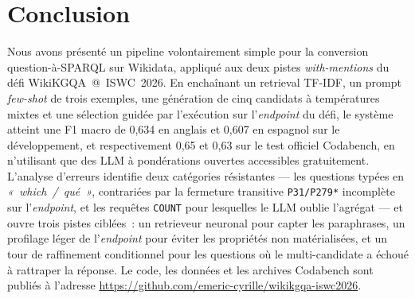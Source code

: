 \documentclass[]{ceurart}
\begin{document}
\section{Conclusion}
\label{sec:conclusion}
Nous avons présenté un pipeline volontairement simple pour la conversion question-à-SPARQL sur Wikidata, appliqué aux deux pistes \emph{with-mentions} du défi WikiKGQA~@~ISWC~2026. En enchaînant un retrieval TF-IDF, un prompt \emph{few-shot} de trois exemples, une génération de cinq candidats à températures mixtes et une sélection guidée par l'exécution sur l'\emph{endpoint} du défi, le système atteint une F1 macro de 0{,}634 en anglais et 0{,}607 en espagnol sur le développement, et respectivement 0{,}65 et 0{,}63 sur le test officiel Codabench, en n'utilisant que des LLM à pondérations ouvertes accessibles gratuitement. L'analyse d'erreurs identifie deux catégories résistantes — les questions typées en \emph{«~which~/~qué~»}, contrariées par la fermeture transitive \texttt{P31/P279*} incomplète sur l'\emph{endpoint}, et les requêtes \texttt{COUNT} pour lesquelles le LLM oublie l'agrégat — et ouvre trois pistes ciblées~: un retrieveur neuronal pour capter les paraphrases, un profilage léger de l'\emph{endpoint} pour éviter les propriétés non matérialisées, et un tour de raffinement conditionnel pour les questions où le multi-candidate a échoué à rattraper la réponse. Le code, les données et les archives Codabench sont publiés à l'adresse \url{https://github.com/emeric-cyrille/wikikgqa-iswc2026}.


\end{document}
